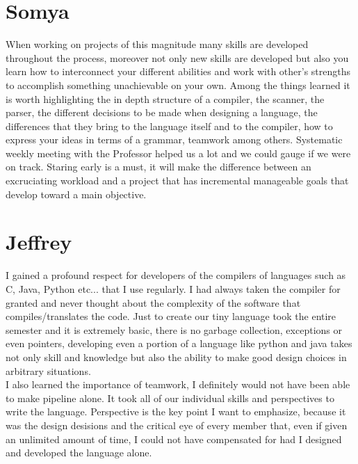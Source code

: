 \documentclass[./Report_main.tex]{subfiles}
\begin{document}
\section{Somya}
When working on projects of this magnitude many skills are developed throughout the
process, moreover not only new skills are developed but also you learn how to interconnect
your different abilities and work with other's strengths to accomplish something unachievable on
your own.
Among the things learned it is worth highlighting the in depth structure of a compiler, the
scanner, the parser, the different decisions to be made when designing a language, the
differences that they bring to the language itself and to the compiler, how to express your ideas
in terms of a grammar, teamwork among others.
Systematic weekly meeting with the Professor helped us a lot and we could gauge if we were on track. Staring early is a must, it will make the difference between an excruciating workload and a
project that has incremental manageable goals that develop toward a main objective.
\section{Jeffrey}
I gained a profound respect for developers of the compilers of languages such as C, Java, Python etc... that I use regularly. I had always taken the compiler for granted and never thought about the complexity of the software that compiles/translates the code. Just to create our tiny language took the entire semester and it is extremely basic, there is no garbage collection, exceptions or even pointers, developing even a portion of a language like python and java takes not only skill and knowledge but also the ability to make good design choices in arbitrary situations. \\
I also learned the importance of teamwork, I definitely would not have been able to make pipeline alone. It took all of our individual skills and perspectives to write the language. Perspective is the key point I want to emphasize, because it was the design desisions and the critical eye of every member that, even if given an unlimited amount of time, I could not have compensated for had I designed and developed the language alone.
\end{document}
